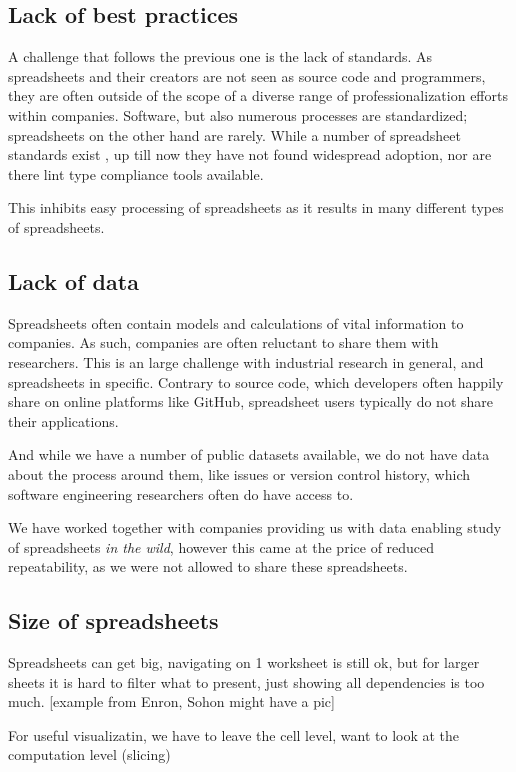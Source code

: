 \documentclass[conference]{IEEEtran}
\begin{document}
\subsection{Lack of best practices}
A challenge that follows the previous one is the lack of standards. As spreadsheets and their creators are not seen as source code and programmers, they are often outside of the scope of a diverse range of professionalization efforts within companies. Software, but also numerous processes are standardized; spreadsheets on the other hand are rarely. While a number of spreadsheet standards exist , up till now they have not found widespread adoption, nor are there lint type compliance tools available.

This inhibits easy processing of spreadsheets as it results in many different types of spreadsheets.

\subsection{Lack of data}
Spreadsheets often contain models and calculations of vital information to companies. As such, companies are often reluctant to share them with researchers. This is an large challenge with industrial research in general, and spreadsheets in specific. Contrary to source code, which developers often happily share on online platforms like GitHub, spreadsheet users typically do not share their applications. 

And while we have a number of public datasets available, we do not have data about the process around them, like issues or version control history, which software engineering researchers often do have access to. 

We have worked together with companies providing us with data enabling study of spreadsheets \emph{in the wild}, however this came at the price of reduced repeatability, as we were not allowed to share these spreadsheets.

\subsection{Size of spreadsheets }
Spreadsheets can get big, navigating on 1 worksheet is still ok, but for larger sheets it is hard to filter what to present, just showing all dependencies is too much. [example from Enron, Sohon might have a pic]

For useful visualizatin, we have to leave the cell level, want to look at the computation level (slicing)
\end{document}
